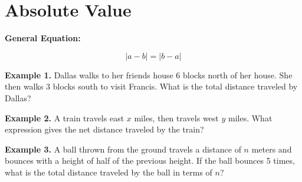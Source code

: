 \section{Absolute Value}

\bigskip
\textbf{General Equation:}

\[|a-b|=|b-a|\]

\vfill
\textbf{Example 1.} Dallas walks to her friends house 6 blocks north of her house. She then walks 3 blocks south to visit Francis. What is the total distance traveled by Dallas?

\vfill
\textbf{Example 2.} A train travels east $x$ miles, then travels west $y$ miles. What expression gives the net distance traveled by the train?

\vfill
\textbf{Example 3.} A ball thrown from the ground travels a distance of $n$ meters and bounces with a height of half of the previous height. If the ball bounces 5 times, what is the total distance traveled by the ball in terms of $n$?

